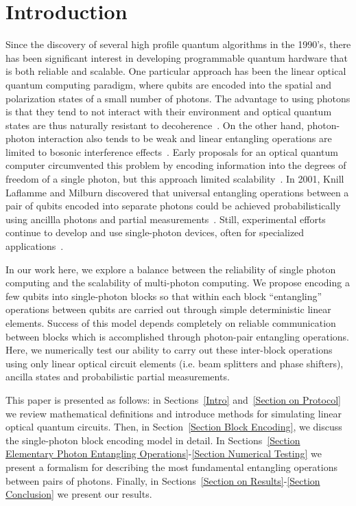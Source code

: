 \documentclass[aps,pra,twocolumn,showpacs,superscriptaddress,floatfix,10pt]{revtex4}
\begin{document}
\section{Introduction}
 Since the discovery of several high profile quantum algorithms in the 1990's, there has been significant interest in developing programmable quantum hardware that is both reliable and scalable. One particular approach has been the linear optical quantum computing paradigm, where qubits are encoded into the spatial and polarization states of a small number of photons. The advantage to using photons is that they tend to not interact with their environment and optical quantum states are thus naturally resistant to decoherence~\cite{Review Paper}. On the other hand, photon-photon interaction also tends to be weak and linear entangling operations are limited to bosonic interference effects~\cite{Review Paper,Hong Ou Mandel}. Early proposals for an optical quantum computer circumvented this problem by encoding information into the degrees of freedom of a single photon, but this approach limited scalability~\cite{Adami,Torma,Pittman}. In 2001, Knill Laflamme and Milburn discovered that universal entangling operations between a pair of qubits encoded into separate photons could be achieved probabilistically using ancillla photons and partial measurements~\cite{KLM,KLM2}. Still, experimental efforts continue to develop and use single-photon devices, often for specialized applications~\cite{Bao,Starek,Barreiro,Graham,Lanyon, Schreiber, Sansoni,Zadeh}.
 
  In our work here, we explore a balance between the reliability of single photon computing and the scalability of multi-photon computing. We propose encoding a few qubits into single-photon blocks so that within each block ``entangling'' operations between qubits are carried out through simple deterministic linear elements. Success of this model depends completely on reliable communication between blocks which is accomplished through photon-pair entangling operations. Here, we numerically test our ability to carry out these inter-block operations using only linear optical circuit elements  (i.e. beam splitters and phase shifters), ancilla states and probabilistic partial measurements.
  
  This paper is presented as follows: in Sections~\ref{Intro} and~\ref{Section on Protocol} we review mathematical definitions and introduce methods for simulating linear optical quantum circuits. Then, in Section~\ref{Section Block Encoding}, we discuss the single-photon block encoding model in detail. In Sections~\ref{Section Elementary Photon Entangling Operations}-\ref{Section Numerical Testing} we present a formalism for describing the most fundamental entangling operations between pairs of photons. Finally, in Sections~\ref{Section on Results}-\ref{Section Conclusion} we present our results.
\end{document}
